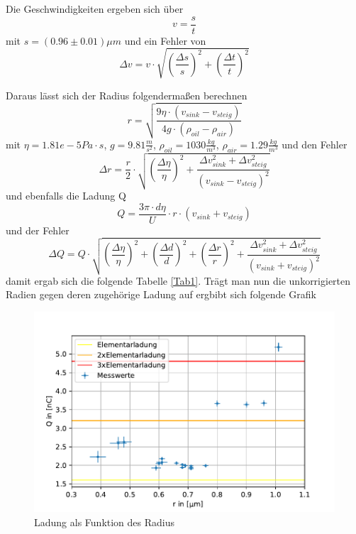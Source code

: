 \documentclass{scrartcl}
\begin{document}
            Die Geschwindigkeiten ergeben sich über
            \begin{equation}
                v = \frac{s}{t}
            \end{equation}
            mit $s = (0.96 \pm 0.01) \mu m$ und ein Fehler von
            \begin{equation}
                \Delta v = v \cdot \sqrt{(\frac{\Delta s}{s})^2 + (\frac{\Delta t}{t})^2} 
            \end{equation}

            Daraus lässt sich der Radius folgendermaßen berechnen
            \begin{equation}
                r = \sqrt{\frac{9\eta \cdot (v_{sink}-v_{steig})}{4 g \cdot (\rho_{oil}-\rho_{air})}}
            \end{equation}
            mit $\eta = 1.81e-5 Pa\cdot s$, $g=9.81 \frac{m}{s^2}$, $\rho_{oil} = 1030 \frac{kg}{m^3}$, $\rho_{air} = 1.29 \frac{kg}{m^3}$
            und den Fehler
            \begin{equation}
                \Delta r = \frac{r}{2} \cdot \sqrt{(\frac{\Delta \eta}{\eta})^2+\frac{\Delta v_{sink}^2+\Delta v_{steig}^2}{(v_{sink}-v_{steig})^2}}
            \end{equation}
            und ebenfalls die Ladung Q
            \begin{equation}
                Q = \frac{3\pi \cdot d\eta}{U} \cdot r \cdot (v_{sink}+v_{steig})
            \end{equation}
            und der Fehler
            \begin{equation}
                \Delta Q = Q \cdot \sqrt{(\frac{\Delta \eta}{\eta})^2 + (\frac{\Delta d}{d})^2+(\frac{\Delta r}{r})^2 + \frac{\Delta v_{sink}^2 + \Delta v_{steig}^2}{(v_{sink} + v_{steig})^2}}
            \end{equation}
            damit ergab sich die folgende Tabelle \ref{Tab1}.
            Trägt man nun die unkorrigierten Radien gegen deren zugehörige Ladung auf ergbibt sich folgende Grafik
            \begin{figure}[H]
                \centering
                \includegraphics[width=1.0\textwidth]{QoverRUncorr.pdf}
                \caption{Ladung als Funktion des Radius}
                \label{Abbildung5}
            \end{figure}
\end{document}
